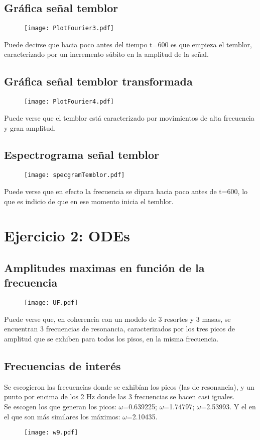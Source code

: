 \documentclass[11pt,letterpaper]{exam}
\begin{document}
\subsection{Gráfica señal temblor}
\begin{figure}[H]
\centering
\texttt{[image: PlotFourier3.pdf]}
\end{figure}
Puede decirse que hacia poco antes del tiempo t=600 es que empieza el temblor, caracterizado por un incremento súbito en la amplitud de la señal.

\subsection{Gráfica señal temblor transformada}
\begin{figure}[H]
\centering
\texttt{[image: PlotFourier4.pdf]}
\end{figure}
Puede verse que el temblor está caracterizado por movimientos de alta frecuencia y gran amplitud.

\subsection{Espectrograma señal temblor}
\begin{figure}[H]
\centering
\texttt{[image: specgramTemblor.pdf]}
\end{figure}
Puede verse que en efecto la frecuencia se dipara hacia poco antes de t=600, lo que es indicio de que en ese momento inicia el temblor.

\section{Ejercicio 2: ODEs}
\subsection{Amplitudes maximas en función de la frecuencia}
\begin{figure}[H]
\centering
\texttt{[image: UF.pdf]}
\end{figure}
Puede verse que, en coherencia con un modelo de 3 resortes y 3 masas, se encuentran 3 frecuencias de resonancia, caracterizados por los tres picos de amplitud que se exhiben para todos los pisos, en la misma frecuencia. 

\subsection{Frecuencias de interés}
Se escogieron las frecuencias donde se exhibían los picos (las de resonancia), y un punto por encima de los 2 Hz donde las 3 frecuencias se hacen casi iguales.\\
Se escogen los que generan los picos: $\omega$=0.639225; $\omega$=1.74797;  $\omega$=2.53993. Y el en el que son más similares los máximos: $\omega$=2.10435.
\begin{figure}[H]
\centering
\texttt{[image: w9.pdf]}
\end{figure}
\end{document}
